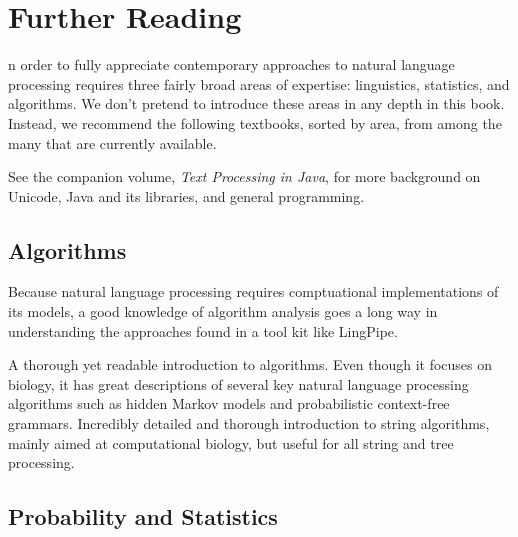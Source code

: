 \chapter{Further Reading}\label{appendix:reading}

n order to fully appreciate contemporary approaches to natural language
processing requires three fairly broad areas of expertise:
linguistics, statistics, and algorithms.  We don't pretend to
introduce these areas in any depth in this book.  Instead, we
recommend the following textbooks, sorted by area, from among the many
that are currently available.

See the companion volume, {\it Text Processing in Java}, for 
more background on Unicode, Java and its libraries, and general
programming.


\section{Algorithms}

\noindent
Because natural language processing requires comptuational
implementations of its models, a good knowledge of algorithm analysis
goes a long way in understanding the approaches found in a tool kit
like LingPipe.

\begin{itemize}
%
{A thorough yet readable introduction to algorithms.}
%
{Even though it focuses on biology, it has great
descriptions of several key natural language processing algorithms
such as hidden Markov models and probabilistic context-free grammars.}
%
{Incredibly detailed and thorough introduction to
string algorithms, mainly aimed at computational biology, but
useful for all string and tree processing.}
%
\end{itemize}






\section{Probability and Statistics}

